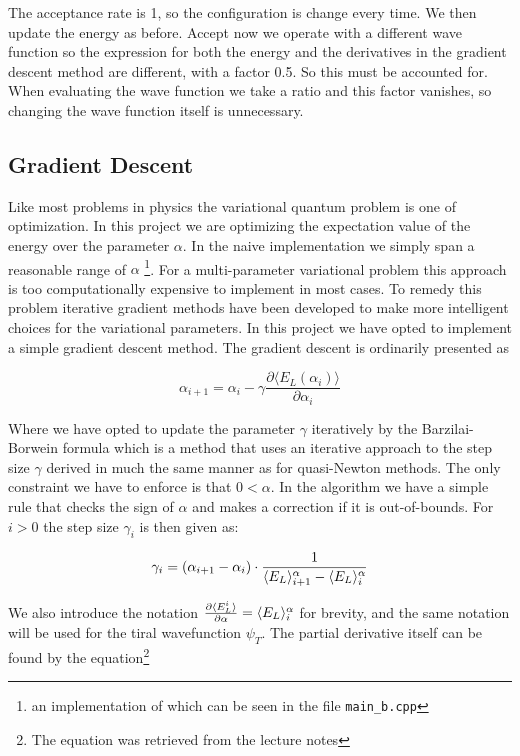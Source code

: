 The acceptance rate is 1, so the configuration is change every time. We then update the energy as before. Accept now we operate with a different wave function so the expression for both the energy and the derivatives in the gradient descent method are different, with a factor 0.5. So this must be accounted for. When evaluating the wave function we take a ratio and this factor vanishes, so changing the wave function itself is unnecessary.


\subsection{Gradient Descent}

Like most problems in physics the variational quantum problem is one of optimization. In this project we are optimizing the expectation value of the energy over the parameter $\alpha$. In the naive implementation we simply span a reasonable range of $\alpha$ \footnote{an implementation of which can be seen in the file \lstinline{main_b.cpp}}. For a multi-parameter variational problem this approach is too computationally expensive to implement in most cases. To remedy this problem iterative gradient methods have been developed to make more intelligent choices for the variational parameters. In this project we have opted to implement a simple gradient descent method. The gradient descent is ordinarily presented as 

\begin{equation}
\alpha_{i+1} = \alpha_i -\gamma \frac{\partial \langle E_L (\alpha_i) \rangle}{\partial \alpha_i}
\end{equation}

\noindent Where we have opted to update the parameter $\gamma$ iteratively by the Barzilai-Borwein formula which is a method that uses an iterative approach to the step size $\gamma$ derived in much the same manner as for quasi-Newton methods\cite{OptTheory}. The only constraint we have to enforce is that $0 < \alpha$. In the algorithm we have a simple rule  that checks the sign of $\alpha$ and makes a correction if it is out-of-bounds. For $i > 0$ the step size $\gamma_i$ is then given as: 

\begin{equation}
\gamma_i = (\alpha_{i+1} - \alpha_i) \cdot \frac{1}{\langle E_L \rangle^\alpha_{i+1} - \langle E_L \rangle^\alpha_i}
\end{equation}

\noindent We also introduce the notation $\frac{\partial \langle E_L^i \rangle}{\partial \alpha} = \langle E_L \rangle^\alpha_{i}$ for brevity, and the same notation will be used for the tiral wavefunction $\psi_T$. The partial derivative itself can be found by the equation\footnote{The equation was retrieved from the lecture notes} 


